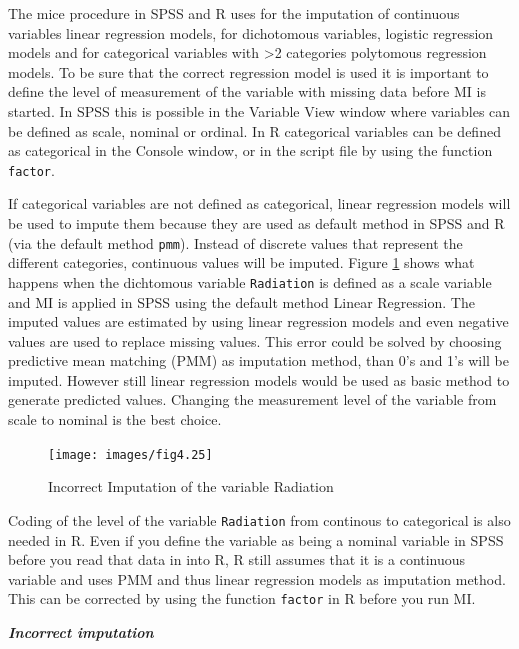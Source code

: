 \documentclass[
]{book}
\begin{document}
The mice procedure in SPSS and R uses for the imputation of continuous variables linear regression models, for dichotomous variables, logistic regression models and for categorical variables with \textgreater2 categories polytomous regression models. To be sure that the correct regression model is used it is important to define the level of measurement of the variable with missing data before MI is started. In SPSS this is possible in the Variable View window where variables can be defined as scale, nominal or ordinal. In R categorical variables can be defined as categorical in the Console window, or in the script file by using the function \texttt{factor}.

If categorical variables are not defined as categorical, linear regression models will be used to impute them because they are used as default method in SPSS and R (via the default method \texttt{pmm}). Instead of discrete values that represent the different categories, continuous values will be imputed. Figure \ref{fig:fig4-25} shows what happens when the dichtomous variable \texttt{Radiation} is defined as a scale variable and MI is applied in SPSS using the default method Linear Regression. The imputed values are estimated by using linear regression models and even negative values are used to replace missing values. This error could be solved by choosing predictive mean matching (PMM) as imputation method, than 0's and 1's will be imputed. However still linear regression models would be used as basic method to generate predicted values. Changing the measurement level of the variable from scale to nominal is the best choice.

\begin{figure}

{\centering \texttt{[image: images/fig4.25]} 

}

\caption{Incorrect Imputation of the variable Radiation}\label{fig:fig4-25}
\end{figure}

Coding of the level of the variable \texttt{Radiation} from continous to categorical is also needed in R. Even if you define the variable as being a nominal variable in SPSS before you read that data in into R, R still assumes that it is a continuous variable and uses PMM and thus linear regression models as imputation method. This can be corrected by using the function
\texttt{factor} in R before you run MI.

\textbf{\emph{Incorrect imputation}}
\end{document}
